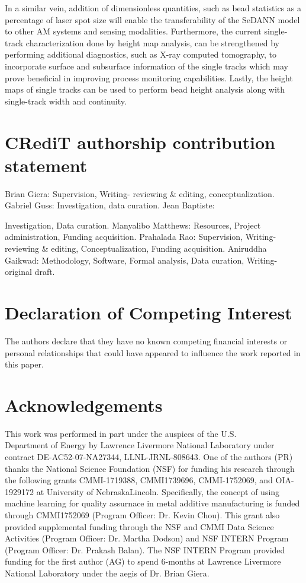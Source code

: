 \documentclass[10pt]{article}
\begin{document}
In a similar vein, addition of dimensionless quantities, such as bead statistics as a percentage of laser spot size will enable the transferability of the SeDANN model to other AM systems and sensing modalities. Furthermore, the current single-track characterization done by height map analysis, can be strengthened by performing additional diagnostics, such as X-ray computed tomography, to incorporate surface and subsurface information of the single tracks which may prove beneficial in improving process monitoring capabilities. Lastly, the height maps of single tracks can be used to perform bead height analysis along with single-track width and continuity.

\section*{CRediT authorship contribution statement}
Brian Giera: Supervision, Writing- reviewing \& editing, conceptualization. Gabriel Guss: Investigation, data curation. Jean Baptiste:

Investigation, Data curation. Manyalibo Matthews: Resources, Project administration, Funding acquisition. Prahalada Rao: Supervision, Writing- reviewing \& editing, Conceptualization, Funding acquisition. Aniruddha Gaikwad: Methodology, Software, Formal analysis, Data curation, Writing- original draft.

\section*{Declaration of Competing Interest}
The authors declare that they have no known competing financial interests or personal relationships that could have appeared to influence the work reported in this paper.

\section*{Acknowledgements}
This work was performed in part under the auspices of the U.S.\\
Department of Energy by Lawrence Livermore National Laboratory under contract DE-AC52-07-NA27344, LLNL-JRNL-808643. One of the authors (PR) thanks the National Science Foundation (NSF) for funding his research through the following grants CMMI-1719388, CMMI1739696, CMMI-1752069, and OIA-1929172 at University of NebraskaLincoln. Specifically, the concept of using machine learning for quality assurnace in metal additive manufacturing is funded through CMMI1752069 (Program Officer: Dr. Kevin Chou). This grant also provided supplemental funding through the NSF and CMMI Data Science Activities (Program Officer: Dr. Martha Dodson) and NSF INTERN Program (Program Officer: Dr. Prakash Balan). The NSF INTERN Program provided funding for the first author (AG) to spend 6-months at Lawrence Livermore National Laboratory under the aegis of Dr. Brian Giera.
\end{document}
